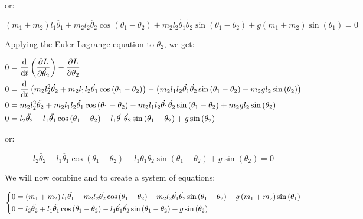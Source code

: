 or:

\begin{equation}
    \left(m_1 + m_2\right)l_1\ddot{\theta_1} + m_2l_2\ddot{\theta_2}\cos\left(\theta_1 - \theta_2\right) + m_2l_2\dot{\theta_1}\dot{\theta_2}\sin\left(\theta_1 - \theta_2\right) + g\left(m_1 + m_2\right)\sin\left(\theta_1\right) = 0
    \label{eq:bob-1-motion}
\end{equation}

Applying the Euler-Lagrange equation to $\theta_2$, we get:

\begin{align*}
    0 &= \diff[]{}{t}\left(\pdiff[]{L}{\dot{\theta_2}}\right) - \pdiff[]{L}{\theta_2}\\
    0 &= \diff[]{}{t}\left(m_2l_2^2\dot{\theta_2} + m_2l_1l_2\dot{\theta_1}\cos\left(\theta_1 - \theta_2\right)\right) - \left(m_2l_1l_2\dot{\theta_1}\dot{\theta_2}\sin\left(\theta_1 - \theta_2\right) - m_2gl_2\sin\left(\theta_2\right)\right)\\
    0 &= m_2l_2^2\ddot{\theta_2} + m_2l_1l_2\ddot{\theta_1}\cos\left(\theta_1 - \theta_2\right) - m_2l_1l_2\dot{\theta_1}\dot{\theta_2}\sin\left(\theta_1 - \theta_2\right) + m_2gl_2\sin\left(\theta_2\right)\\
    0 &= l_2\ddot{\theta_2} + l_1\ddot{\theta_1}\cos\left(\theta_1 - \theta_2\right) - l_1\dot{\theta_1}\dot{\theta_2}\sin\left(\theta_1 - \theta_2\right) + g\sin\left(\theta_2\right)
\end{align*}

or:

\begin{equation}
    l_2\ddot{\theta_2} + l_1\ddot{\theta_1}\cos\left(\theta_1 - \theta_2\right) - l_1\dot{\theta_1}\dot{\theta_2}\sin\left(\theta_1 - \theta_2\right) + g\sin\left(\theta_2\right) = 0
    \label{eq:bob-2-motion}
\end{equation}

We will now combine  and  to create a system of equations:

\begin{equation*}
    \begin{dcases}
        \begin{aligned}
            0 &= \left(m_1 + m_2\right)l_1\ddot{\theta_1} + m_2l_2\ddot{\theta_2}\cos\left(\theta_1 - \theta_2\right) + m_2l_2\dot{\theta_1}\dot{\theta_2}\sin\left(\theta_1 - \theta_2\right) + g\left(m_1 + m_2\right)\sin\left(\theta_1\right)\\
            0 &= l_2\ddot{\theta_2} + l_1\ddot{\theta_1}\cos\left(\theta_1 - \theta_2\right) - l_1\dot{\theta_1}\dot{\theta_2}\sin\left(\theta_1 - \theta_2\right) + g\sin\left(\theta_2\right)
        \end{aligned}
    \end{dcases}
\end{equation*}

